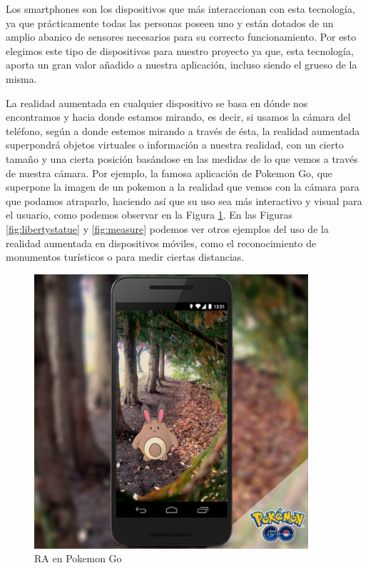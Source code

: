 Los smartphones son los dispositivos que más interaccionan con esta tecnología, ya que prácticamente todas las personas poseen uno
 y están dotados de un amplio abanico de sensores necesarios para su correcto funcionamiento. Por esto elegimos este tipo de dispositivos para nuestro
 proyecto ya que, esta tecnología, aporta un gran valor añadido a nuestra aplicación, incluso siendo el grueso de la misma. 

 La realidad aumentada en cualquier dispositivo se basa en dónde nos encontramos y hacia donde estamos mirando, es decir, si usamos la cámara del teléfono,
 según a donde estemos mirando a través de ésta, la realidad aumentada superpondrá objetos virtuales o información a nuestra realidad, con un cierto tamaño y una cierta posición
 basándose en las medidas de lo que vemos a través de nuestra cámara. Por ejemplo, la famosa aplicación de Pokemon Go, que superpone la imagen de un pokemon a la realidad
 que vemos con la cámara para que podamos atraparlo, haciendo así que su uso sea más interactivo y visual para el usuario, como podemos observar en la Figura \ref{fig:pokemon}. En las Figuras \ref{fig:libertystatue} y \ref{fig:measure}
 podemos ver otros ejemplos del uso de la realidad aumentada en dispositivos móviles, como el reconocimiento de monumentos turísticos o para medir ciertas distancias.

 \begin{figure}[H]
    \centering
    \includegraphics[width=4in]{figures/chapter-2/pokemongo.png}
    \caption{RA en Pokemon Go\cite{pokemongo}}
    \label{fig:pokemon}
\end{figure}

